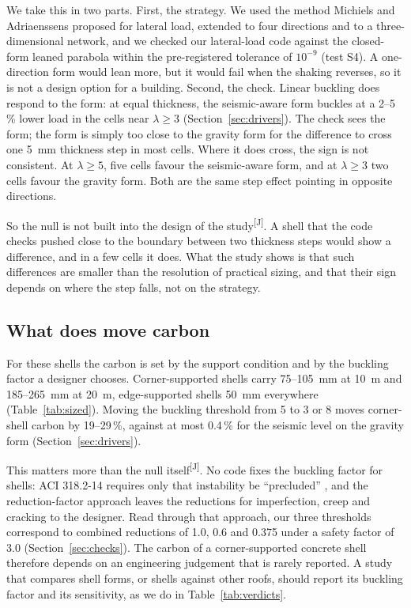 \documentclass[preprint,12pt]{elsarticle}
\newcommand{\jud}{\textsuperscript{\textcolor{markcol}{\sffamily\scriptsize[J]}}}
\newcommand{\jud}{}
\begin{document}
We take this in two parts. First, the strategy. We used the method Michiels and Adriaenssens proposed for lateral load, extended to four directions and to a three-dimensional network, and we checked our lateral-load code against the closed-form leaned parabola within the pre-registered tolerance of $10^{-9}$ (test S4). A one-direction form would lean more, but it would fail when the shaking reverses, so it is not a design option for a building. Second, the check. Linear buckling does respond to the form: at equal thickness, the seismic-aware form buckles at a 2--5\,\% lower load in the cells near $\lambda \geq 3$ (Section~\ref{sec:drivers}). The check sees the form; the form is simply too close to the gravity form for the difference to cross one 5~mm thickness step in most cells. Where it does cross, the sign is not consistent. At $\lambda \geq 5$, five cells favour the seismic-aware form, and at $\lambda \geq 3$ two cells favour the gravity form. Both are the same step effect pointing in opposite directions.

So the null is not built into the design of the study\jud. A shell that the code checks pushed close to the boundary between two thickness steps would show a difference, and in a few cells it does. What the study shows is that such differences are smaller than the resolution of practical sizing, and that their sign depends on where the step falls, not on the strategy.

\subsection{What does move carbon}

For these shells the carbon is set by the support condition and by the buckling factor a designer chooses. Corner-supported shells carry 75--105~mm at 10~m and 185--265~mm at 20~m, edge-supported shells 50~mm everywhere (Table~\ref{tab:sized}). Moving the buckling threshold from 5 to 3 or 8 moves corner-shell carbon by 19--29\,\%, against at most 0.4\,\% for the seismic level on the gravity form (Section~\ref{sec:drivers}).

This matters more than the null itself\jud. No code fixes the buckling factor for shells: ACI 318.2-14 requires only that instability be ``precluded'' \cite[cl.~3.1.8]{ACI3182}, and the reduction-factor approach \cite{Dulacska1995} leaves the reductions for imperfection, creep and cracking to the designer. Read through that approach, our three thresholds correspond to combined reductions of 1.0, 0.6 and 0.375 under a safety factor of 3.0 (Section~\ref{sec:checks}). The carbon of a corner-supported concrete shell therefore depends on an engineering judgement that is rarely reported. A study that compares shell forms, or shells against other roofs, should report its buckling factor and its sensitivity, as we do in Table~\ref{tab:verdicts}.
\end{document}
